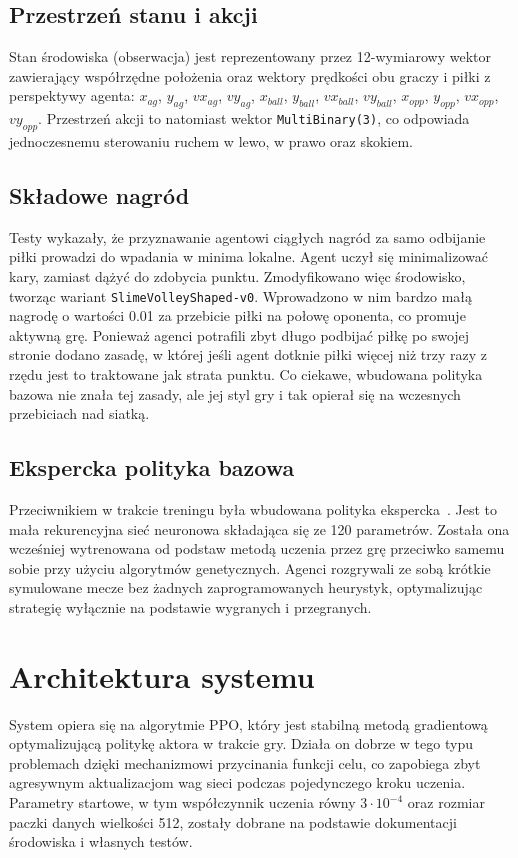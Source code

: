 \subsection{Przestrzeń stanu i akcji}\label{subsec:state-action}
Stan środowiska (obserwacja) jest reprezentowany przez 12-wymiarowy wektor zawierający współrzędne położenia oraz wektory prędkości obu graczy i piłki z perspektywy agenta: $x_{ag}$, $y_{ag}$, $vx_{ag}$, $vy_{ag}$, $x_{ball}$, $y_{ball}$, $vx_{ball}$, $vy_{ball}$, $x_{opp}$, $y_{opp}$, $vx_{opp}$, $vy_{opp}$. Przestrzeń akcji to natomiast wektor \texttt{MultiBinary(3)}, co odpowiada jednoczesnemu sterowaniu ruchem w lewo, w prawo oraz skokiem.

\subsection{Składowe nagród}\label{subsec:reward-shaping}
Testy wykazały, że przyznawanie agentowi ciągłych nagród za samo odbijanie piłki prowadzi do wpadania w minima lokalne. Agent uczył się minimalizować kary, zamiast dążyć do zdobycia punktu. Zmodyfikowano więc środowisko, tworząc wariant \texttt{SlimeVolleyShaped-v0}. Wprowadzono w nim bardzo małą nagrodę o wartości 0.01 za przebicie piłki na połowę oponenta, co promuje aktywną grę. Ponieważ agenci potrafili zbyt długo podbijać piłkę po swojej stronie dodano zasadę, w której jeśli agent dotknie piłki więcej niż trzy razy z rzędu jest to traktowane jak strata punktu. Co ciekawe, wbudowana polityka bazowa nie znała tej zasady, ale jej styl gry i tak opierał się na wczesnych przebiciach nad siatką.

\subsection{Ekspercka polityka bazowa}\label{subsec:baseline-policy}
Przeciwnikiem w trakcie treningu była wbudowana polityka ekspercka~\cite{ha2015slimevolley}. Jest to mała rekurencyjna sieć neuronowa składająca się ze 120 parametrów. Została ona wcześniej wytrenowana od podstaw metodą uczenia przez grę przeciwko samemu sobie przy użyciu algorytmów genetycznych. Agenci rozgrywali ze sobą krótkie symulowane mecze bez żadnych zaprogramowanych heurystyk, optymalizując strategię wyłącznie na podstawie wygranych i przegranych.

\section{Architektura systemu}\label{sec:architecture}
System opiera się na algorytmie PPO, który jest stabilną metodą gradientową optymalizującą politykę aktora w trakcie gry. Działa on dobrze w tego typu problemach dzięki mechanizmowi przycinania funkcji celu, co zapobiega zbyt agresywnym aktualizacjom wag sieci podczas pojedynczego kroku uczenia. Parametry startowe, w tym współczynnik uczenia równy $3 \cdot 10^{-4}$ oraz rozmiar paczki danych wielkości 512, zostały dobrane na podstawie dokumentacji środowiska i własnych testów.

